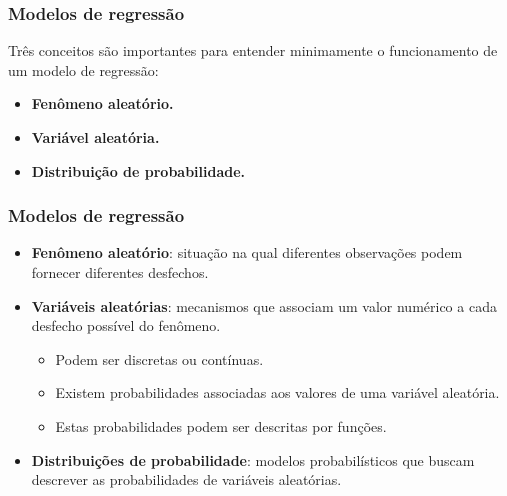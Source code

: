 \documentclass[10pt,
  aspectratio=169,
  serif,
  mathserif,
  professionalfont,
  compress,
  handout,
  ]{beamer}\usepackage[]{graphicx}\usepackage[]{color}
\begin{document}
\begin{frame}
  \frametitle{Modelos de regressão}

  Três conceitos são importantes para entender minimamente o funcionamento de um modelo de regressão:
  
  \begin{itemize}
  
  \itemsep 2ex
  
  \item \textbf{Fenômeno aleatório.}
  \item \textbf{Variável aleatória.}
  \item \textbf{Distribuição de probabilidade.}
\end{itemize}

\end{frame}


\begin{frame}
  \frametitle{Modelos de regressão}

  \begin{itemize}
    \itemsep 2ex

  \item \textbf{Fenômeno aleatório}: situação na qual diferentes observações podem fornecer diferentes desfechos. 
  
  \item \textbf{Variáveis aleatórias}: mecanismos que associam um valor numérico a cada desfecho possível do fenômeno. 
  
  \begin{itemize}
    \item Podem ser discretas ou contínuas.
    \item Existem probabilidades associadas aos valores de uma variável aleatória.
    \item Estas probabilidades podem ser descritas por funções.
  \end{itemize}

  \item \textbf{Distribuições de probabilidade}: modelos probabilísticos que buscam descrever as probabilidades de variáveis aleatórias.

  \end{itemize}
\end{frame}

\end{document}
